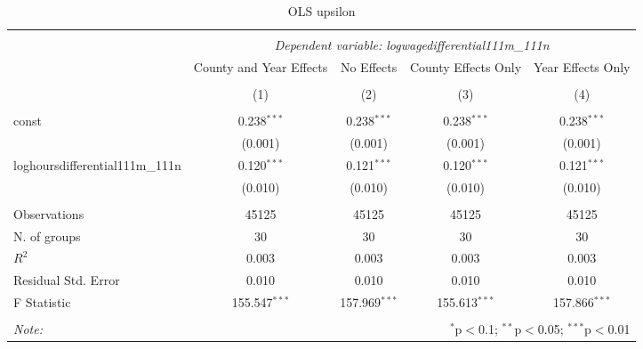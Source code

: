 \documentclass{report}
\begin{document}
\begin{table}[!htbp] \centering
  \caption{OLS upsilon }
\begin{tabular}{@{\extracolsep{5pt}}lcccc}
\\[-1.8ex]\hline
\hline \\[-1.8ex]
& \multicolumn{4}{c}{\textit{Dependent variable: logwagedifferential111m_111n}} \
\cr \cline{2-5}
\\[-1.8ex] & \multicolumn{1}{c}{County and Year Effects} & \multicolumn{1}{c}{No Effects} & \multicolumn{1}{c}{County Effects Only} & \multicolumn{1}{c}{Year Effects Only}  \\
\\[-1.8ex] & (1) & (2) & (3) & (4) \\
\hline \\[-1.8ex]
 const & 0.238$^{***}$ & 0.238$^{***}$ & 0.238$^{***}$ & 0.238$^{***}$ \\
& (0.001) & (0.001) & (0.001) & (0.001) \\
 loghoursdifferential111m_111n & 0.120$^{***}$ & 0.121$^{***}$ & 0.120$^{***}$ & 0.121$^{***}$ \\
& (0.010) & (0.010) & (0.010) & (0.010) \\
\hline \\[-1.8ex]
 Observations & 45125 & 45125 & 45125 & 45125 \\
 N. of groups & 30 & 30 & 30 & 30 \\
 $R^2$ & 0.003 & 0.003 & 0.003 & 0.003 \\
 Residual Std. Error & 0.010 & 0.010 & 0.010 & 0.010 \\
 F Statistic & 155.547$^{***}$ & 157.969$^{***}$ & 155.613$^{***}$ & 157.866$^{***}$ \\
\hline
\hline \\[-1.8ex]
\textit{Note:} & \multicolumn{4}{r}{$^{*}$p$<$0.1; $^{**}$p$<$0.05; $^{***}$p$<$0.01} \\
\end{tabular}
\end{table}
\end{document}

